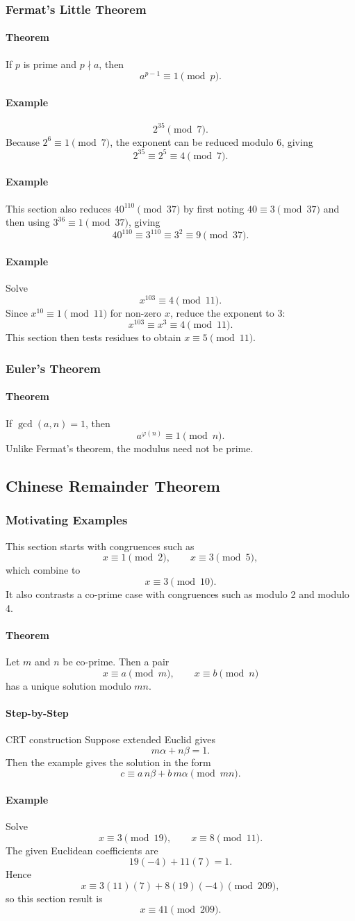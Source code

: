 \documentclass[12pt]{article}
\newcommand{\Step}{\paragraph{Step-by-Step}}
\newcommand{\Example}{\paragraph{Example}}
\newcommand{\Theorem}{\paragraph{Theorem}}
\begin{document}
\subsubsection{Fermat's Little Theorem}
\Theorem If $p$ is prime and $p\nmid a$, then
\[
a^{p-1}\equiv1\pmod p.
\]

\Example
\[
2^{35}\pmod7.
\]
Because $2^6\equiv1\pmod7$, the exponent can be reduced modulo 6, giving
\[
2^{35}\equiv2^5\equiv4\pmod7.
\]

\Example This section also reduces $40^{110}\pmod{37}$ by first noting $40\equiv3\pmod{37}$ and then using $3^{36}\equiv1\pmod{37}$, giving
\[
40^{110}\equiv3^{110}\equiv3^2\equiv9\pmod{37}.
\]

\Example Solve
\[
x^{103}\equiv4\pmod{11}.
\]
Since $x^{10}\equiv1\pmod{11}$ for non-zero $x$, reduce the exponent to 3:
\[
x^{103}\equiv x^3\equiv4\pmod{11}.
\]
This section then tests residues to obtain $x\equiv5\pmod{11}$.

\subsubsection{Euler's Theorem}
\Theorem If $\gcd(a,n)=1$, then
\[
a^{\varphi(n)}\equiv1\pmod n.
\]
Unlike Fermat's theorem, the modulus need not be prime.

\subsection{Chinese Remainder Theorem}
\subsubsection{Motivating Examples}
This section starts with congruences such as
\[
x\equiv1\pmod2,
\qquad x\equiv3\pmod5,
\]
which combine to
\[
x\equiv3\pmod{10}.
\]
It also contrasts a co-prime case with congruences such as modulo 2 and modulo 4.

\Theorem Let $m$ and $n$ be co-prime. Then a pair
\[
x\equiv a\pmod m,
\qquad x\equiv b\pmod n
\]
has a unique solution modulo $mn$.

\Step{CRT construction}
Suppose extended Euclid gives
\[
m\alpha+n\beta=1.
\]
Then the example gives the solution in the form
\[
c\equiv a\,n\beta+b\,m\alpha\pmod{mn}.
\]

\Example Solve
\[
x\equiv3\pmod{19},\qquad x\equiv8\pmod{11}.
\]
The given Euclidean coefficients are
\[
19(-4)+11(7)=1.
\]
Hence
\[
x\equiv3(11)(7)+8(19)(-4)\pmod{209},
\]
so this section result is
\[
x\equiv41\pmod{209}.
\]
\end{document}
